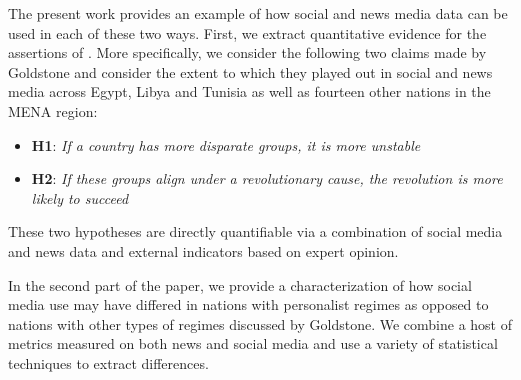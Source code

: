 The present work provides an example of how social and news media data can be used in each of these two ways. First, we extract quantitative evidence for the assertions of . More specifically, we consider the following two claims made by Goldstone and consider the extent to which they played out in social and news media across Egypt, Libya and Tunisia as well as fourteen other nations in the MENA region:
\begin{itemize}
	\item {\bf H1}: \emph{If a country has more disparate groups, it is more unstable}
	\item {\bf H2}: \emph{If these groups align under a revolutionary cause, the revolution is more likely to succeed}
\end{itemize}

These two hypotheses are directly quantifiable via a combination of social media and news data and external indicators based on expert opinion.  

In the second part of the paper, we provide a characterization of how social media use may have differed in nations with personalist regimes as opposed to nations with other types of regimes discussed by Goldstone. We combine a host of metrics measured on both news and social media and use a variety of statistical techniques to extract differences.  




